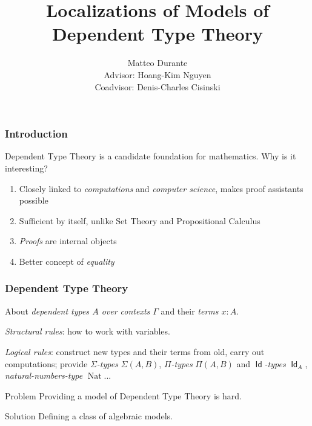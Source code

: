 \documentclass{beamer}
\title{Localizations of Models of Dependent Type Theory}
\author{Matteo Durante \\ Advisor: Hoang-Kim Nguyen \\ Coadvisor: Denis-Charles
Cisinski}
\institute{Regensburg University}
\DeclareMathOperator{\Id}{\mathsf{Id}}
\DeclareMathOperator{\nat}{Nat}
\begin{document}
\newtheorem{thm}{Theorem}[section]
\newtheorem{prop}{Proposition}[section]
\newtheorem{defn}{Definition}[section]
\newtheorem{conj}{Conjecture}[section]
\newtheorem{lem}{Lemma}[section]

\frame{\titlepage}

\begin{frame}
  \frametitle{Introduction}

  Dependent Type Theory is a candidate foundation for mathematics. Why is it
  interesting?

  \begin{enumerate}
    \item Closely linked to \emph{computations} and \emph{computer science},
      makes proof assistants possible
    \item Sufficient by itself, unlike Set Theory and Propositional Calculus
    \item \emph{Proofs} are internal objects
    \item Better concept of \emph{equality}
  \end{enumerate}
\end{frame}

\begin{frame}
  \frametitle{Dependent Type Theory}
  About \emph{dependent types $A$ over contexts
  $\Gamma$} and their \emph{terms $x:A$}.

  \emph{Structural rules}: how to work with variables.

  \emph{Logical rules}: construct new types and their terms from old, carry out
  computations; provide \emph{$\Sigma$-types} $\Sigma(A,B)$, \emph{$\Pi$-types}
  $\Pi(A,B)$ and \emph{$\Id$-types} $\Id_A$, \emph{natural-numbers-type}
  $\nat$...

  \begin{block}{Problem}
    Providing a model of Dependent Type Theory is hard.
  \end{block}

  \begin{block}{Solution}
    Defining a class of algebraic models.
  \end{block}
\end{frame}
\end{document}

